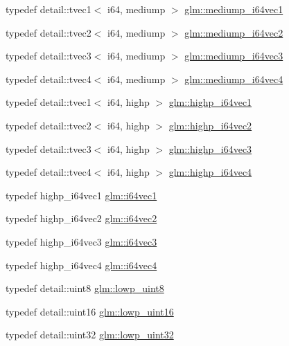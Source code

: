 \begin{DoxyCompactItemize}
typedef detail\+::tvec1$<$ i64, mediump $>$ \hyperlink{group__gtc__type__precision_gad2423a91c791b9ca2f8a3ecfc71b080d}{glm\+::mediump\+\_\+i64vec1}
\item 
typedef detail\+::tvec2$<$ i64, mediump $>$ \hyperlink{group__gtc__type__precision_ga5cf0bec13b01b6124e966360cffe15a4}{glm\+::mediump\+\_\+i64vec2}
\item 
typedef detail\+::tvec3$<$ i64, mediump $>$ \hyperlink{group__gtc__type__precision_gae1aa82d2b9a62a87648306205dfe69ab}{glm\+::mediump\+\_\+i64vec3}
\item 
typedef detail\+::tvec4$<$ i64, mediump $>$ \hyperlink{group__gtc__type__precision_gab4db11ebb425fa18fe5d15d455c360a3}{glm\+::mediump\+\_\+i64vec4}
\item 
typedef detail\+::tvec1$<$ i64, highp $>$ \hyperlink{group__gtc__type__precision_ga06c21aba992669f5c160ec5f5a480522}{glm\+::highp\+\_\+i64vec1}
\item 
typedef detail\+::tvec2$<$ i64, highp $>$ \hyperlink{group__gtc__type__precision_gabfe3aa6fa4003a47577beb9678ab2661}{glm\+::highp\+\_\+i64vec2}
\item 
typedef detail\+::tvec3$<$ i64, highp $>$ \hyperlink{group__gtc__type__precision_ga4030f8ad15da56f5e427aa457d39e888}{glm\+::highp\+\_\+i64vec3}
\item 
typedef detail\+::tvec4$<$ i64, highp $>$ \hyperlink{group__gtc__type__precision_ga0ea279cd954fbb71a1db62e897d4d7f5}{glm\+::highp\+\_\+i64vec4}
\item 
typedef highp\+\_\+i64vec1 \hyperlink{group__gtc__type__precision_ga8bc234da7e4a6436e01241f439fc7ddd}{glm\+::i64vec1}
\item 
typedef highp\+\_\+i64vec2 \hyperlink{group__gtc__type__precision_ga75461c98baf3e3913566550bd9d8d17f}{glm\+::i64vec2}
\item 
typedef highp\+\_\+i64vec3 \hyperlink{group__gtc__type__precision_gab6eefcd7eb24e4142ed23dc1e87163a6}{glm\+::i64vec3}
\item 
typedef highp\+\_\+i64vec4 \hyperlink{group__gtc__type__precision_ga19846034cab6ee6e031884ea30def7fc}{glm\+::i64vec4}
\item 
typedef detail\+::uint8 \hyperlink{group__gtc__type__precision_ga4d9dc08b7b248a386dfe9afd00fc6b1e}{glm\+::lowp\+\_\+uint8}
\item 
typedef detail\+::uint16 \hyperlink{group__gtc__type__precision_ga9b8409887319f62f06e664f6ca121b9d}{glm\+::lowp\+\_\+uint16}
\item 
typedef detail\+::uint32 \hyperlink{group__gtc__type__precision_gaf11e85af414720b4cd12bd57b3a81e68}{glm\+::lowp\+\_\+uint32}

\end{DoxyCompactItemize}
